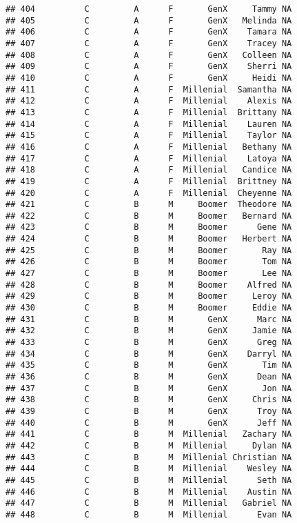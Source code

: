 \documentclass[
]{article}
\begin{document}
\begin{verbatim}
## 404          C         A      F       GenX     Tammy NA
## 405          C         A      F       GenX   Melinda NA
## 406          C         A      F       GenX    Tamara NA
## 407          C         A      F       GenX    Tracey NA
## 408          C         A      F       GenX   Colleen NA
## 409          C         A      F       GenX    Sherri NA
## 410          C         A      F       GenX     Heidi NA
## 411          C         A      F  Millenial  Samantha NA
## 412          C         A      F  Millenial    Alexis NA
## 413          C         A      F  Millenial  Brittany NA
## 414          C         A      F  Millenial    Lauren NA
## 415          C         A      F  Millenial    Taylor NA
## 416          C         A      F  Millenial   Bethany NA
## 417          C         A      F  Millenial    Latoya NA
## 418          C         A      F  Millenial   Candice NA
## 419          C         A      F  Millenial  Brittney NA
## 420          C         A      F  Millenial  Cheyenne NA
## 421          C         B      M     Boomer  Theodore NA
## 422          C         B      M     Boomer   Bernard NA
## 423          C         B      M     Boomer      Gene NA
## 424          C         B      M     Boomer   Herbert NA
## 425          C         B      M     Boomer       Ray NA
## 426          C         B      M     Boomer       Tom NA
## 427          C         B      M     Boomer       Lee NA
## 428          C         B      M     Boomer    Alfred NA
## 429          C         B      M     Boomer     Leroy NA
## 430          C         B      M     Boomer     Eddie NA
## 431          C         B      M       GenX      Marc NA
## 432          C         B      M       GenX     Jamie NA
## 433          C         B      M       GenX      Greg NA
## 434          C         B      M       GenX    Darryl NA
## 435          C         B      M       GenX       Tim NA
## 436          C         B      M       GenX      Dean NA
## 437          C         B      M       GenX       Jon NA
## 438          C         B      M       GenX     Chris NA
## 439          C         B      M       GenX      Troy NA
## 440          C         B      M       GenX      Jeff NA
## 441          C         B      M  Millenial   Zachary NA
## 442          C         B      M  Millenial     Dylan NA
## 443          C         B      M  Millenial Christian NA
## 444          C         B      M  Millenial    Wesley NA
## 445          C         B      M  Millenial      Seth NA
## 446          C         B      M  Millenial    Austin NA
## 447          C         B      M  Millenial   Gabriel NA
## 448          C         B      M  Millenial      Evan NA

\end{verbatim}
\end{document}
